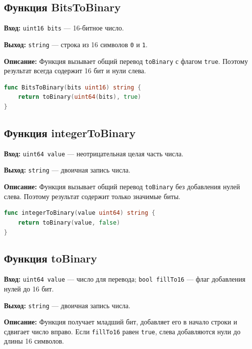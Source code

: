 \newpage

\subsection*{Функция BitsToBinary}
\textbf{Вход:} \texttt{uint16 bits} --- 16-битное число. \par
\textbf{Выход:} \texttt{string} --- строка из 16 символов \texttt{0} и
\texttt{1}. \par
\textbf{Описание:} Функция вызывает общий перевод \texttt{toBinary} с флагом
\texttt{true}. Поэтому результат всегда содержит 16 бит и нули слева.

\begin{lstlisting}[style=common, language=Go, caption=BitsToBinary, label=lst:bits-to-binary]
func BitsToBinary(bits uint16) string {
    return toBinary(uint64(bits), true)
}
\end{lstlisting}


\subsection*{Функция integerToBinary} 
\textbf{Вход:} \texttt{uint64 value} --- неотрицательная целая часть числа. \par
\textbf{Выход:} \texttt{string} --- двоичная запись числа. \par
\textbf{Описание:} Функция вызывает общий перевод \texttt{toBinary} без
добавления нулей слева. Поэтому результат содержит только значимые биты.

\begin{lstlisting}[style=common, language=Go, caption=integerToBinary, label=lst:integer-to-binary]
func integerToBinary(value uint64) string {
    return toBinary(value, false)
}

\end{lstlisting}

\subsection*{Функция toBinary}
\textbf{Вход:} \texttt{uint64 value} --- число для перевода;
\texttt{bool fillTo16} --- флаг добавления нулей до 16 бит. \par
\textbf{Выход:} \texttt{string} --- двоичная запись числа. \par
\textbf{Описание:} Функция получает младший бит, добавляет его в начало
строки и сдвигает число вправо. Если \texttt{fillTo16} равен \texttt{true},
слева добавляются нули до длины 16 символов.

